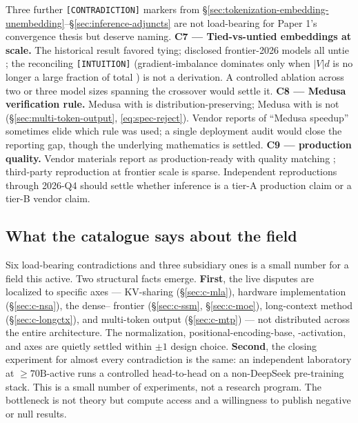 Three further \texttt{[CONTRADICTION]} markers from
\S\ref{sec:tokenization-embedding-unembedding}--\S\ref{sec:inference-adjuncts}
are not load-bearing for Paper 1's convergence thesis but deserve
naming. \textbf{C7 --- Tied-vs-untied embeddings at scale.} The
historical \citet{press2017-tied-embed} result favored tying;
disclosed frontier-2026 models all untie
\citep{meta-llama3, olmo2, deepseek-v3, qwen3}; the reconciling
\texttt{[INTUITION]} (gradient-imbalance dominates only when $|V| d$ is
no longer a large fraction of total ) is not a derivation. A
controlled ablation across two or three model sizes spanning the
crossover would settle it. \textbf{C8 --- Medusa verification rule.}
Medusa with  is distribution-preserving; Medusa with
 is not (\S\ref{sec:multi-token-output},
\cref{eq:spec-reject}). Vendor reports of ``Medusa speedup''
sometimes elide which rule was used; a single deployment audit would
close the reporting gap, though the underlying mathematics is settled.
\textbf{C9 ---  production quality.} Vendor materials report
 as production-ready with quality matching ; third-party
reproduction at frontier scale is sparse. Independent reproductions
through 2026-Q4 should settle whether  inference is a tier-A
production claim or a tier-B vendor claim.

\subsection{What the catalogue says about the field}
\label{sec:c-meta}

Six load-bearing contradictions and three subsidiary ones is a small
number for a field this active. Two structural facts emerge.
\textbf{First}, the live disputes are localized to specific axes ---
KV-sharing (\S\ref{sec:c-mla}), hardware implementation
(\S\ref{sec:c-nsa}), the dense-- frontier
(\S\ref{sec:c-ssm}, \S\ref{sec:c-moe}), long-context method
(\S\ref{sec:c-longctx}), and multi-token output
(\S\ref{sec:c-mtp}) --- not distributed across the entire architecture.
The normalization, positional-encoding-base, -activation, and
 axes are quietly settled within $\pm 1$ design choice.
\textbf{Second}, the closing experiment for almost every contradiction
is the same: an independent laboratory at $\geq 70\mathrm{B}$-active
runs a controlled head-to-head on a non-DeepSeek pre-training stack.
This is a small number of experiments, not a research program. The
bottleneck is not theory but compute access and a willingness to
publish negative or null results.

